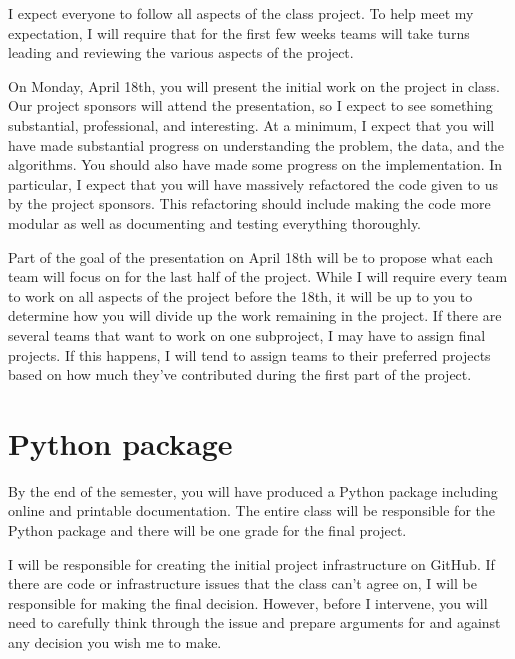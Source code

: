 \documentclass[11pt, oneside]{article}   	%
\begin{document}
I expect everyone to follow all aspects of the class project.  To help
meet my expectation, I will require that for the first few weeks teams
will take turns leading and reviewing the various aspects of the project.

On Monday, April 18th, you will present the initial work on the project in
class.  Our project sponsors will attend the presentation, so I expect to see
something substantial, professional, and interesting.  At a minimum, I expect
that you will have made substantial progress on understanding the problem, the
data, and the algorithms.  You should also have made some progress on the
implementation.  In particular, I expect that you will have massively
refactored the code given to us by the project sponsors.  This refactoring
should include making the code more modular as well as documenting and
testing everything thoroughly.

Part of the goal of the presentation on April 18th will be to propose what each
team will focus on for the last half of the project.  While I will require
every team to work on all aspects of the project before the 18th, it will be up
to you to determine how you will divide up the work remaining in the project.
If there are several teams that want to work on one subproject, I may have to
assign final projects.  If this happens, I will tend to assign teams to their
preferred projects based on how much they've contributed during the first part
of the project.


\section{Python package}

By the end of the semester, you will have produced a Python package including
online and printable documentation.  The entire class will be responsible for
the Python package and there will be one grade for the final project.

I will be responsible for creating the initial project infrastructure on
GitHub.  If there are code or infrastructure issues that the class can't agree
on, I will be responsible for making the final decision.  However, before I
intervene, you will need to carefully think through the issue and prepare
arguments for and against any decision you wish me to make.
\end{document}
